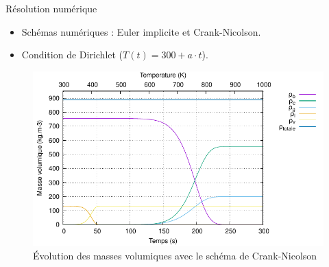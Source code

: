 \documentclass{beamer}
\begin{document}
\begin{frame}{Résolution numérique}
    \begin{itemize}
        \item Schémas numériques : Euler implicite et Crank-Nicolson.
        \item Condition de Dirichlet ($T(t) = 300 + a \cdot t$).
    \end{itemize}
    \begin{figure}
        \centering
        \includegraphics[width=0.8\linewidth]{images/densite_CK2.pdf}
        \caption{Évolution des masses volumiques avec le schéma de Crank-Nicolson}
    \end{figure}
\end{frame}
\end{document}
